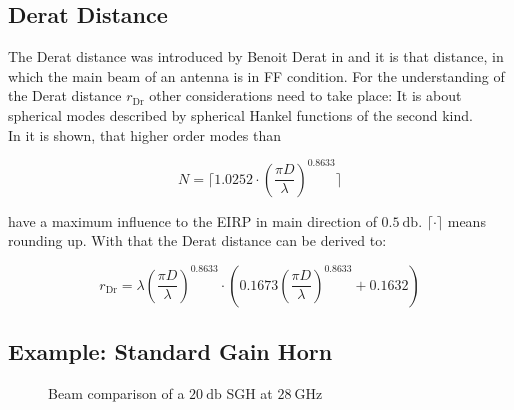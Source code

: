 \subsection{Derat Distance}

The Derat distance was introduced by Benoit Derat in \cite{8393926} and it is that distance, in which the main beam of an antenna is in \ac{FF} condition. For the understanding of the Derat distance $r_{\text{Dr}}$ other considerations need to take place: It is about spherical modes described by spherical Hankel functions  of the second kind. \cite{8393926} \cite{hansen}\\
In \cite{8393926} it is shown, that higher order modes than 

\begin{equation}
N = \Bigg\lceil 1.0252\cdot\left(\frac{\pi D}{\lambda}\right)^{0.8633} \Bigg\rceil
\end{equation}

have a maximum influence to the \ac{EIRP} in main direction of $\SI{0.5}{\decibel}$. $\lceil\cdot\rceil$ means rounding up. With that the Derat distance can be derived to:

\begin{equation}
r_{\text{Dr}} = \lambda\left(\frac{\pi D}{\lambda}\right)^{0.8633}\cdot\left(0.1673\left(\frac{\pi D}{\lambda}\right)^{0.8633}+0.1632\right)
\end{equation}

\subsection{Example: Standard Gain Horn}

\begin{figure}[h]
\centering
  \centering
  \centering
  \centering
  \centering
\caption{Beam comparison of a $\SI{20}{\decibel}$ SGH at $\SI{28}{\giga\hertz}$}
\label{fig:beamcpmp}
\end{figure}

